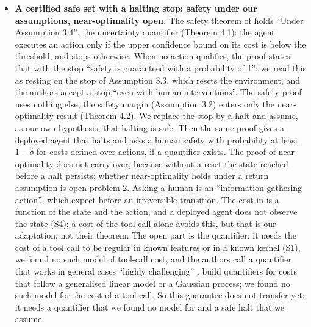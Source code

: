 \documentclass{article}
\begin{document}
\begin{itemize}
\item
  \textbf{A certified safe set with a halting stop: safety under our assumptions, near-optimality open.} The safety theorem of \citet{wachi2023} holds ``Under Assumption 3.4'', the uncertainty quantifier (Theorem 4.1): the agent executes an action only if the upper confidence bound on its cost is below the threshold, and stops otherwise. When no action qualifies, the proof states that with the stop ``safety is guaranteed with a probability of 1''; we read this as resting on the stop of Assumption 3.3, which resets the environment, and the authors accept a stop ``even with human interventions''. The safety proof uses nothing else; the safety margin (Assumption 3.2) enters only the near-optimality result (Theorem 4.2). We replace the stop by a halt and assume, as our own hypothesis, that halting is safe. Then the same proof gives a deployed agent that halts and asks a human safety with probability at least \(1-\delta\) for costs defined over actions, if a quantifier exists. The proof of near-optimality does not carry over, because without a reset the state reached before a halt persists; whether near-optimality holds under a return assumption is open problem 2. Asking a human is an ``information gathering action'', which \citet[§3.6.3]{mclean2026} expect before an irreversible transition. The cost in \citet{wachi2023} is a function of the state and the action, and a deployed agent does not observe the state (S4); a cost of the tool call alone avoids this, but that is our adaptation, not their theorem. The open part is the quantifier: it needs the cost of a tool call to be regular in known features or in a known kernel (S1), we found no such model of tool-call cost, and the authors call a quantifier that works in general cases ``highly challenging'' \citep{wachi2023}. \citet{wachi2023} build quantifiers for costs that follow a generalised linear model or a Gaussian process; we found no such model for the cost of a tool call. So this guarantee does not transfer yet: it needs a quantifier that we found no model for and a safe halt that we assume.
\end{itemize}
\end{document}

